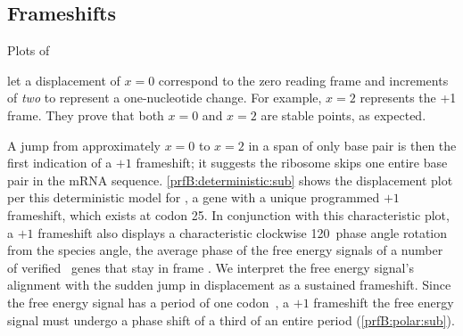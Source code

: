 \documentclass[12pt]{article}
\begin{document}
\subsection{Frameshifts}
\label{section:frameshifts}

\begin{cfigure}
  \caption{Plots of~\prfB}
  \label{prfB:detplots}
\end{cfigure}

\citeauthor{lalit:mechanics} let a displacement of $x = 0$ correspond
to the zero reading frame and increments of \emph{two} to represent a
one-nucleotide change. For example, $x =2$ represents the +1 frame.
They prove that both $x = 0$ and $x = 2$ are
stable points, as expected.

A jump from approximately $x = 0$ to $x = 2$ in a span of only
base pair is then the first indication of a $+1$ frameshift; it
suggests the ribosome skips one entire base pair in the mRNA sequence.
\autoref{prfB:deterministic:sub} shows the displacement plot per this
deterministic model for \prfB, a gene with a unique programmed $+1$
frameshift, which exists at codon 25. In conjunction with this
characteristic plot, a $+1$ frameshift also displays a 
characteristic clockwise 120\degree\ phase angle rotation from the
species angle, the average phase of the free energy signals of a
number of verified \ecoli\ genes that stay in frame
\cite{lalit:mechanics}.  We interpret the free energy signal's
alignment with the sudden jump in displacement as a sustained
frameshift. Since the free energy signal has a period of one
codon~\cite{lalit:mechanics}, a $+1$ frameshift the free energy signal
must undergo a phase shift of a third of an entire period
(\autoref{prfB:polar:sub}).
\end{document}
